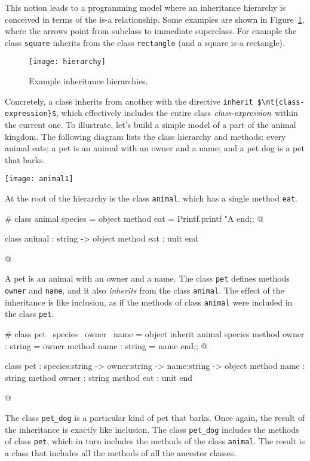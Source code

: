 This notion leads to a programming model where an inheritance hierarchy is conceived in terms of the
is-a relationship.  Some examples are shown in Figure~\ref{figure:inheritance-examples}, where the
arrows point from subclass to immediate superclass.  For example the class \hbox{\lstinline/square/}
inherits from the class \hbox{\lstinline/rectangle/} (and a square is-a rectangle).

\begin{figure}
\centerline{\texttt{[image: hierarchy]}}
\caption{Example inheritance hierarchies.}
\label{figure:inheritance-examples}
\end{figure}

\label{keyword:inherit}
Concretely, a class inherits from another with the directive
\hbox{\lstinline/inherit $\nt{class-expression}$/},
which effectively includes the entire class $\textit{\rmfamily class-expression}$ within the current one. To
illustrate, let's build a simple model of a part of the animal kingdom.  The following diagram
lists the class hierarchy and methods: every animal eats; a pet is an animal with an owner and a
name; and a pet dog is a pet that barks.

\begin{center}
\texttt{[image: animal1]}
\end{center}
%
At the root of the hierarchy is the class \hbox{\lstinline/animal/}, which has a single method \hbox{\lstinline/eat/}.

\begin{ocaml}
# class animal species =
  object
     method eat = Printf.printf "A %
  end;;
@
\begin{topoutput}
class animal : string -> object method eat : unit end
\end{topoutput}
@
\end{ocaml}
%
A pet is an animal with an owner and a name.  The class \hbox{\lstinline/pet/} defines
methods \hbox{\lstinline/owner/} and \hbox{\lstinline/name/}, and it also \emph{inherits} from the
class \hbox{\lstinline/animal/}.  The effect of the inheritance is like inclusion, as if the methods of
class \hbox{\lstinline/animal/} were included in the class \hbox{\lstinline/pet/}.

\begin{ocaml}
# class pet ~species ~owner ~name =
  object
     inherit animal species
     method owner : string = owner
     method name  : string = name
  end;;
@
\begin{topoutput}
class pet : species:string -> owner:string -> name:string ->
  object method name : string method owner : string method eat : unit end
\end{topoutput}
@
\end{ocaml}
%
The class \hbox{\lstinline/pet_dog/} is a particular kind of pet that barks.  Once again, the result of the
inheritance is exactly like inclusion.  The class \hbox{\lstinline/pet_dog/} includes the methods of
class \hbox{\lstinline/pet/}, which in turn includes the methods of the class \hbox{\lstinline/animal/}.  The
result is a class that includes all the methods of all the ancestor classes.

